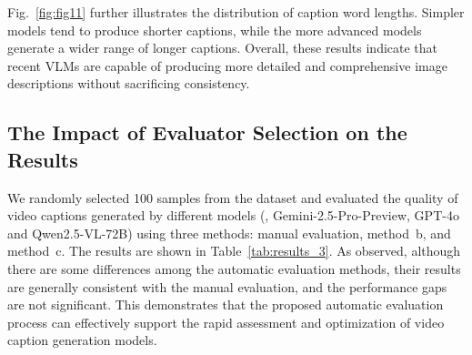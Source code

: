 Fig.~\ref{fig:fig11} further illustrates the distribution of caption word lengths. Simpler models tend to produce shorter captions, while the more advanced models generate a wider range of longer captions. Overall, these results indicate that recent VLMs are capable of producing more detailed and comprehensive image descriptions without sacrificing consistency.

\subsection{The Impact of Evaluator Selection on the Results}\label{exp_app1}

\begin{table}[htbp]
\renewcommand{\arraystretch}{0.6}
\caption{The accuracy (AR), inconsistency rate (IR), and coverage rate (CR) the captions of Gemini-2.5-Pro-Preview, GPT-4o and Qwen2.5-VL-72B, where we compare the results of Gemini-2.5-Pro-Preview, GPT-4o, and Manual comprehensive evaluation. The symbol ``$\uparrow$"  indicates that the larger the value, the better; The symbol ``$\downarrow$" indicates that the smaller the value, the better.}
\label{tab:results_3}
\end{table}

We randomly selected 100 samples from the dataset and evaluated the quality of video captions generated by different models (\eg, Gemini-2.5-Pro-Preview, GPT-4o and Qwen2.5-VL-72B) using three methods: manual evaluation, method~b, and method~c. The results are shown in Table~\ref{tab:results_3}. As observed, although there are some differences among the automatic evaluation methods, their results are generally consistent with the manual evaluation, and the performance gaps are not significant. This demonstrates that the proposed automatic evaluation process can effectively support the rapid assessment and optimization of video caption generation models.


